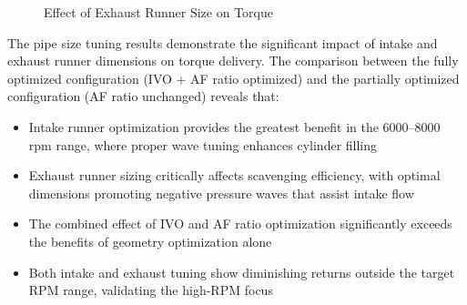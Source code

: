 \begin{figure}[H]
    \caption{Effect of Exhaust Runner Size on Torque}
    \label{fig:task2_exhaust_tuning}
\end{figure}

The pipe size tuning results demonstrate the significant impact of intake and exhaust runner dimensions on torque delivery. The comparison between the fully optimized configuration (IVO + AF ratio optimized) and the partially optimized configuration (AF ratio unchanged) reveals that:

\begin{itemize}
    \item Intake runner optimization provides the greatest benefit in the 6000--8000 rpm range, where proper wave tuning enhances cylinder filling
    \item Exhaust runner sizing critically affects scavenging efficiency, with optimal dimensions promoting negative pressure waves that assist intake flow
    \item The combined effect of IVO and AF ratio optimization significantly exceeds the benefits of geometry optimization alone
    \item Both intake and exhaust tuning show diminishing returns outside the target RPM range, validating the high-RPM focus
\end{itemize}

